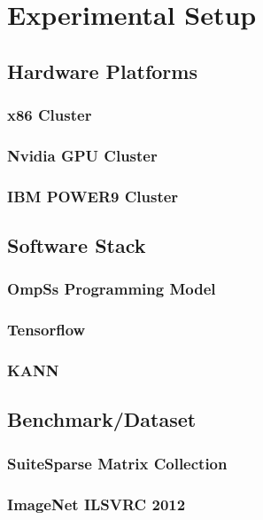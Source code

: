 \chapter{Experimental Setup}
\label{chap:methodology}

\section{Hardware Platforms} 

\subsection{x86 Cluster}
\subsection{Nvidia GPU Cluster}
\subsection{IBM POWER9 Cluster}

\section{Software Stack}

\subsection{OmpSs Programming Model}
\subsection{Tensorflow}
\subsection{KANN}

\section{Benchmark/Dataset}
\subsection{SuiteSparse Matrix Collection}
\subsection{ImageNet ILSVRC 2012}
